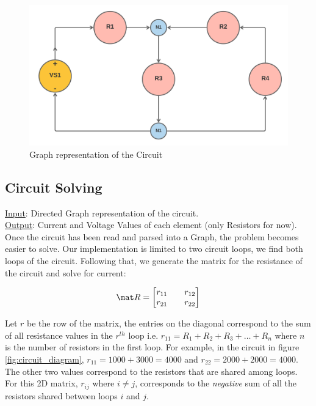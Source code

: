 \documentclass[conference]{IEEEtran}
\begin{document}
    \begin{figure}[h!]
        \centering
        \includegraphics[scale=0.09]{images/Graph_representation.png}
        \caption{Graph representation of the Circuit}
        \label{fig:circuit_graph}
    \end{figure}

    \subsection{Circuit Solving}
    \noindent
    \underline{Input}: Directed Graph representation of the circuit. \\
    \underline{Output}: Current and Voltage Values of each element (only Resistors for now). \\
    Once the circuit has been read and parsed into a Graph, the problem becomes easier to solve. Our implementation is limited to two circuit loops, we find both loops of the circuit. Following that, we generate the matrix for the resistance of the circuit and solve for current: 
    
    \begin{equation}
        \label{eqn:resistance_matrix}
        \mat R = 
        \begin{bmatrix}
        r_{11} && r_{12} \\
        r_{21} && r_{22}
        \end{bmatrix}
    \end{equation}

    Let $r$ be the row of the matrix, the entries on the diagonal correspond to the sum of all resistance values in the $r^{th}$ loop i.e. $r_{11} = R_1 + R_2 + R_3 + \dots + R_n$ where $n$ is the number of resistors in the first loop. For example, in the circuit in figure \ref{fig:circuit_diagram}, $r_{11} = 1000 + 3000 = 4000$ and $r_{22} = 2000 + 2000 = 4000$. The other two values correspond to the resistors that are shared among loops. For this 2D matrix, $r_{ij}$ where $i \neq j$, corresponds to the \textit{negative} sum of all the resistors shared between loops $i$ and $j$.
    
\end{document}
